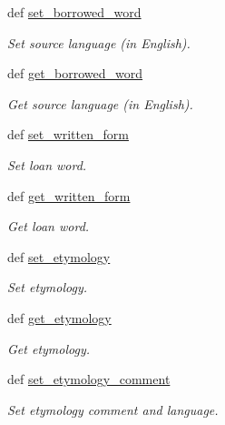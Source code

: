 \begin{DoxyCompactItemize}
def \hyperlink{classlmf_1_1src_1_1core_1_1definition_1_1_definition_a6213c0179642486b85564672e18597d9}{set\+\_\+borrowed\+\_\+word}
\begin{DoxyCompactList}\small\item\em Set source language (in English). \end{DoxyCompactList}\item 
def \hyperlink{classlmf_1_1src_1_1core_1_1definition_1_1_definition_aa3524eaf78f9b8e4ed7b96cb946a5cf6}{get\+\_\+borrowed\+\_\+word}
\begin{DoxyCompactList}\small\item\em Get source language (in English). \end{DoxyCompactList}\item 
def \hyperlink{classlmf_1_1src_1_1core_1_1definition_1_1_definition_a3ea310dacab2046fcdbbf49e24e6d361}{set\+\_\+written\+\_\+form}
\begin{DoxyCompactList}\small\item\em Set loan word. \end{DoxyCompactList}\item 
def \hyperlink{classlmf_1_1src_1_1core_1_1definition_1_1_definition_afd3bfcee887b14bad72a5944f15fd6d3}{get\+\_\+written\+\_\+form}
\begin{DoxyCompactList}\small\item\em Get loan word. \end{DoxyCompactList}\item 
def \hyperlink{classlmf_1_1src_1_1core_1_1definition_1_1_definition_a2c6aca78fe00652774fb89c6d2653c1f}{set\+\_\+etymology}
\begin{DoxyCompactList}\small\item\em Set etymology. \end{DoxyCompactList}\item 
def \hyperlink{classlmf_1_1src_1_1core_1_1definition_1_1_definition_aa4978dd71c6d281d390e1be0a3b7fd46}{get\+\_\+etymology}
\begin{DoxyCompactList}\small\item\em Get etymology. \end{DoxyCompactList}\item 
def \hyperlink{classlmf_1_1src_1_1core_1_1definition_1_1_definition_adec12f10d1c132b1f3accb3bcace4116}{set\+\_\+etymology\+\_\+comment}
\begin{DoxyCompactList}\small\item\em Set etymology comment and language. \end{DoxyCompactList}\item 

\end{DoxyCompactItemize}
